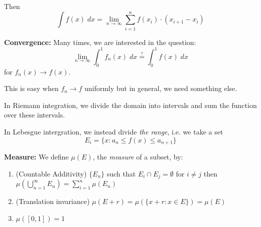 \documentclass[12pt]{article}
\begin{document}
        Then 
        \[\int f(x) \;dx = \lim_{n \to \infty}\sum_{i = 1}^{n} f(x_i)\cdot (x_{i+1} - x_i)\]

        \textbf{Convergence:} Many times, we are interested in the question: 
        \[\lim_{n \to \infty} \int_0^1 f_n(x)\; dx \overset{?}{=} \int_0^1 f(x)\; dx\]
        for $f_n(x) \to f(x)$. 

        This is easy when $f_n \to f$ uniformly but in general, we need something else. 

        In Riemann integration, we divide the domain into intervals and sum the function over these intervals.

        In Lebesgue intergration, we instead divide \emph{the range}, i.e. we take a set 
        \[E_i = \{x: a_n \leq f(x)\leq a_{n+1}\}\] 

        \textbf{Measure:} We define $\mu(E)$, the \emph{measure} of a subset, by:
        \begin{enumerate}
            \item (Countable Additivity) $\{E_n\}$ such that $E_i \cap E_j = \emptyset$ for $i \neq j$ then $\mu(\bigcup_{n=1}^{\infty} E_n) = \sum_{i=1}^n \mu(E_n)$
            \item (Translation invariance) $\mu(E + r) = \mu(\{x + r: x \in E\})= \mu(E)$
            \item $\mu([0,1]) = 1$
        \end{enumerate} 
\end{document}

